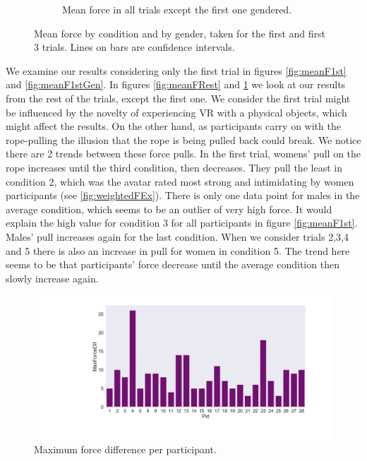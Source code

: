 \begin{figure}[H]
\begin{subfigure}[b]{0.5\textwidth}
     \vspace{-5mm}
     \caption{Mean force in all trials except the first one  gendered.}
     \vspace{-5mm}
     \label{fig:meanFRestGen}
 \end{subfigure}
 \vspace{1mm}
     \caption{Mean force by condition and by gender, taken for the first and first 3 trials. Lines on bars are confidence intervals.}
    \label{fig:forceIn1stRest}
\end{figure}
We examine our results considering only the first trial in figures  \ref{fig:meanF1st} and \ref{fig:meanF1stGen}. In figures \ref{fig:meanFRest} and \ref{fig:meanFRestGen} we look at our results from the rest of the trials, except the first one. We consider the first trial might be influenced by the novelty of experiencing VR with a physical objects, which might affect the results. On the other hand, as participants carry on with the rope-pulling the illusion that the rope is being pulled back could break. We notice there are 2 trends between these force pulls. In the first trial, womens' pull on the rope increases until the third condition, then decreases. They pull the least in condition 2, which was the avatar rated most strong and intimidating by women participants (see \ref{fig:weightedFEx}). There is only one data point for males in the average condition, which seems to be an outlier of very high force. It would explain the high value for condition 3 for all participants in figure \ref{fig:meanF1st}. Males' pull increases again for the last condition. When we consider trials 2,3,4 and 5 there is also an increase in pull for women in condition 5. The trend here seems to be that participants' force decrease until the average condition then slowly increase again.
\begin{figure}[H]
\hspace{-20mm}
 \captionsetup{justification=centering,margin=0.1cm}
 \centering
 \includegraphics[scale=0.3]{Files/Plots/max_force_dif.png}
 \vspace{-10mm}
 \caption{Maximum force difference per participant.}
\label{fig:forceDif}
\end{figure} 
